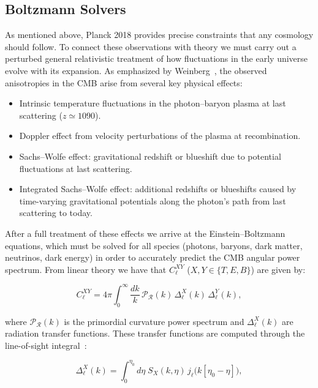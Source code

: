 \documentclass[11pt,a4paper]{article}
\numberwithin{equation}{section}
\begin{document}
\subsection{Boltzmann Solvers}
\label{sec:boltzmann}

As mentioned above, Planck 2018 provides precise constraints that any cosmology should follow. To connect these observations with theory we must carry out a perturbed general relativistic treatment of how fluctuations in the early universe evolve with its expansion. As emphasized by Weinberg~\cite{weinberg2008}, the observed anisotropies in the CMB arise from several key physical effects:

\begin{itemize}
    \item Intrinsic temperature fluctuations in the photon–baryon plasma at last scattering ($z \simeq 1090$).
    \item Doppler effect from velocity perturbations of the plasma at recombination.
    \item Sachs–Wolfe effect: gravitational redshift or blueshift due to potential fluctuations at last scattering.
    \item Integrated Sachs–Wolfe effect: additional redshifts or blueshifts caused by time-varying gravitational potentials along the photon’s path from last scattering to today.
\end{itemize}

After a full treatment of these effects we arrive at the Einstein–Boltzmann equations, which must be solved for all species (photons, baryons, dark matter, neutrinos, dark energy) in order to accurately predict the CMB angular power spectrum. From linear theory we have that $C_\ell^{XY}$ ($X,Y \in \{T,E,B\}$) are given by:

\begin{equation}
C_\ell^{XY} = 4\pi \int_0^\infty \frac{dk}{k}\,
\mathcal{P}_{\mathcal{R}}(k)\, \Delta_\ell^X(k)\, \Delta_\ell^Y(k),
\end{equation}

where $\mathcal{P}_{\mathcal{R}}(k)$ is the primordial curvature power spectrum and 
$\Delta_\ell^X(k)$ are radiation transfer functions. These transfer functions are computed through the line-of-sight integral~\cite{seljak1996}:

\begin{equation}
\Delta_\ell^X(k) = \int_0^{\eta_0} d\eta \;
S_X(k,\eta)\, j_\ell\!\big(k[\eta_0-\eta]\big),
\end{equation}
\end{document}

